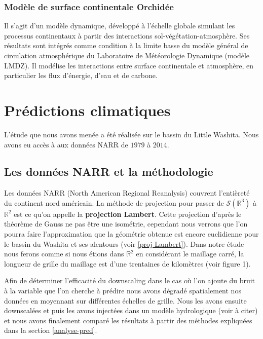 \documentclass[a4paper,10pt]{article}
\begin{document}
	\subsubsection{Modèle de surface continentale Orchidée}
	
	Il s’agit d’un modèle dynamique, développé à l’échelle globale simulant les processus continentaux à partir des interactions sol-végétation-atmosphère. Ses résultats sont intégrés comme condition à la limite basse du modèle général de circulation atmosphérique du Laboratoire de Météorologie Dynamique (modèle LMDZ). Il modélise les interactions entre surface continentale et atmosphère, en particulier les flux d'énergie, d'eau et de carbone.
	
	
	\section{Prédictions climatiques}
	
	L'étude que nous avons menée a été réalisée sur le bassin du Little Washita. Nous avons eu accès à aux données NARR de $1979$ à $2014$.
	\subsection{Les données NARR et la méthodologie}
	\label{NARRs}
	Les données NARR (North American Regional Reanalysis) couvrent l'entièreté du continent nord américain. La méthode de projection pour passer de $\mathcal{S}(\mathbb{R}^3)$ à $\mathbb{R}^2$ est ce qu'on appelle la \textbf{projection Lambert}. Cette projection d'après le théorème de Gauss ne pas être une isométrie, cependant nous verrons que l'on pourra faire l'approximation que la géométrie obtenue est encore euclidienne pour le bassin du Washita et ses alentours (voir \ref{proj-Lambert}). Dans notre étude nous ferons comme si nous étions dans $\mathbb{R}^2$ en considérant le maillage carré, la longueur de grille du maillage est d'une trentaines de kilomètres (voir figure 1).
	
	
	Afin de déterminer l'efficacité du downscaling dans le cas où l'on ajoute du bruit à la variable que l'on cherche à prédire nous avons dégradé spatialement nos données en moyennant sur différentes échelles de grille.
	Nous les avons ensuite downscalées et puis les avons injectées dans un modèle hydrologique (voir à citer) et nous avons finalement comparé les résultats à partir des méthodes expliquées dans la section \ref{analyse-pred}.
	
\end{document}
